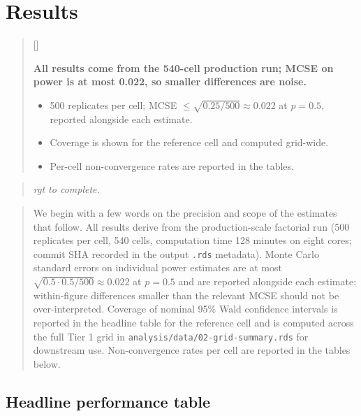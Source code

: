 \documentclass[
  11pt,
]{article}
\newcounter{pgraph}
\newenvironment{bullets}{%
  \stepcounter{pgraph}%
  \begin{quote}\small\sffamily\color[gray]{0.30}%
  {\normalfont\scriptsize\color[gray]{0.58}[\thepgraph]\enspace}}{%
  \end{quote}}
\newenvironment{rgt}{%
  \begin{quote}\small\itshape\color[RGB]{20,60,160}}{%
  \end{quote}}
\newenvironment{orig}{%
  \begin{quote}\normalsize\color[gray]{0.55}}{%
  \end{quote}}
\begin{document}
\section{Results}\label{results}

\begin{bullets}

\textbf{All results come from the 540-cell production run; MCSE on
power is at most 0.022, so smaller differences are noise.}

\begin{itemize}\setlength{\itemsep}{2pt}\setlength{\parskip}{0pt}
\item 500 replicates per cell; MCSE $\leq \sqrt{0.25/500} \approx
0.022$ at $p = 0.5$, reported alongside each estimate.
\item Coverage is shown for the reference cell and computed
grid-wide.
\item Per-cell non-convergence rates are reported in the tables.
\end{itemize}

\end{bullets}

\begin{rgt}
rgt to complete.

\end{rgt}

\begin{orig}
We begin with a few words on the precision and scope of the
estimates that follow. All results derive from the
production-scale factorial run (500 replicates per cell, 540
cells, computation time 128 minutes on eight cores; commit SHA
recorded in the output \texttt{.rds} metadata). Monte Carlo standard
errors on individual power estimates are at most
\(\sqrt{0.5 \cdot 0.5 / 500} \approx 0.022\) at \(p = 0.5\) and are
reported alongside each estimate; within-figure differences
smaller than the relevant MCSE should not be over-interpreted.
Coverage of nominal 95\% Wald confidence intervals is reported
in the headline table for the reference cell and is computed
across the full Tier 1 grid in \texttt{analysis/data/02-grid-summary.rds}
for downstream use. Non-convergence rates per cell are reported
in the tables below.

\end{orig}

\subsection{Headline performance table}\label{sec-headline}
\end{document}
